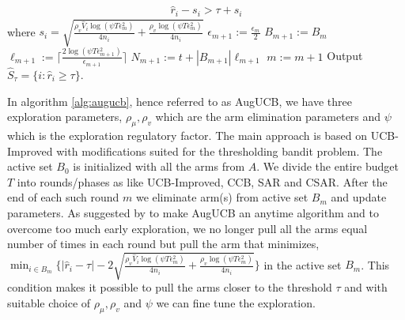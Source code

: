 \begin{algorithm}[th!]
\begin{algorithmic}
\begin{align*}
\hat{r}_{i} - s_i  > \tau + s_i
\end{align*}
where $s_i=\sqrt{\frac{\rho_v\hat{V}_{i}\log{(\psi T\epsilon_{m}^{2})}}{4 n_{i}} + \frac{\rho_v \log{(\psi T\epsilon_{m}^{2})}}{4 n_{i}}}$
\EndArmElimV
\State {}
\ResetParam
\State $\epsilon_{m+1}:=\frac{\epsilon_{m}}{2}$
\State $B_{m+1} := B_{m}$
\State $\ell_{m+1}:=\bigg\lceil \frac{2\log(\psi T\epsilon_{m+1}^{2})}{\epsilon_{m+1}} \bigg\rceil$
\State $N_{m+1} := t + |B_{m+1}|\ell_{m+1}$
\State $m := m+1$
\EndResetParam
\EndIf
\EndFor
\State Output $\hat{S}_{\tau}=\lbrace i: \hat{r}_{i}\geq \tau \rbrace$.
\end{algorithmic}
\end{algorithm}



In algorithm \ref{alg:augucb}, hence referred to as AugUCB, we have three exploration parameters, $\rho_{\mu}, \rho_v$ which are the arm elimination parameters and $\psi$ which is the exploration regulatory factor. The main approach is based on UCB-Improved with modifications suited for the thresholding bandit problem. The active set $B_{0}$ is initialized with all the arms from $A$. We divide the entire budget $T$ into rounds/phases as like UCB-Improved, CCB, SAR and CSAR. After the end of each such round $m$ we eliminate arm(s) from active set $B_{m}$ and update parameters. As suggested by \cite{liu2016modification} to make AugUCB an anytime algorithm and to overcome too much early exploration, we no longer pull all the arms equal number of times in each round but pull the arm that minimizes,  
$\min_{i\in B_{m}}\big\lbrace |\hat{r}_{i} - \tau | - 2\sqrt{\frac{\rho_v \hat{V}_{i} \log (\psi T \epsilon_{m}^{2})}{4 n_{i}} + \frac{\rho_v \log{(\psi T\epsilon_{m}^{2})}}{4 n_{i}}} \big\rbrace $
in the active set $B_{m}$. This condition makes it possible to pull the arms closer to the threshold $\tau$ and with suitable choice of $\rho_{\mu},\rho_v$ and $\psi$ we can fine tune the exploration. 
